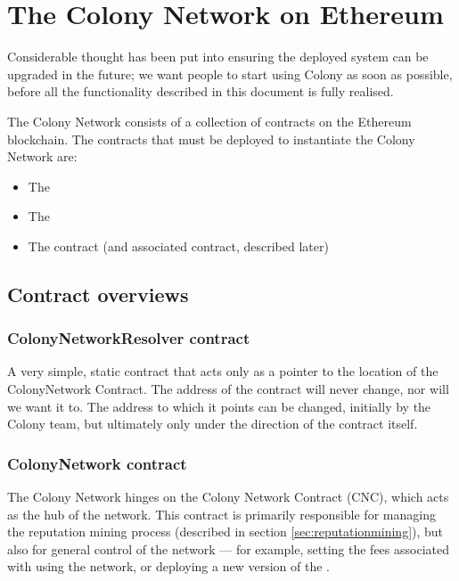 \section{The Colony Network on Ethereum}\label{sec:colonynetwork}

Considerable thought has been put into ensuring the deployed system can be upgraded in the future; we want people to start using Colony as soon as possible, before all the functionality described in this document is fully realised.

The Colony Network consists of a collection of contracts on the Ethereum blockchain. The contracts that must be deployed to instantiate the Colony Network are:

\begin{itemize}
\item The 
\item The 
\item The  contract (and associated  contract, described later)
\end{itemize}
\subsection{Contract overviews}

\subsubsection{ColonyNetworkResolver contract}
A very simple, static contract that acts only as a pointer to the location of the ColonyNetwork Contract. The address of the  contract will never change, nor will we want it to. The address to which it points can be changed, initially by the Colony team, but ultimately only under the direction of the  contract itself.

\subsubsection {ColonyNetwork contract}

The Colony Network hinges on the Colony Network Contract (CNC), which acts as the hub of the network. This contract is primarily responsible for managing the reputation mining process (described in section \ref{sec:reputationmining}), but also for general control of the network --- for example, setting the fees associated with using the network, or deploying a new version of the .

